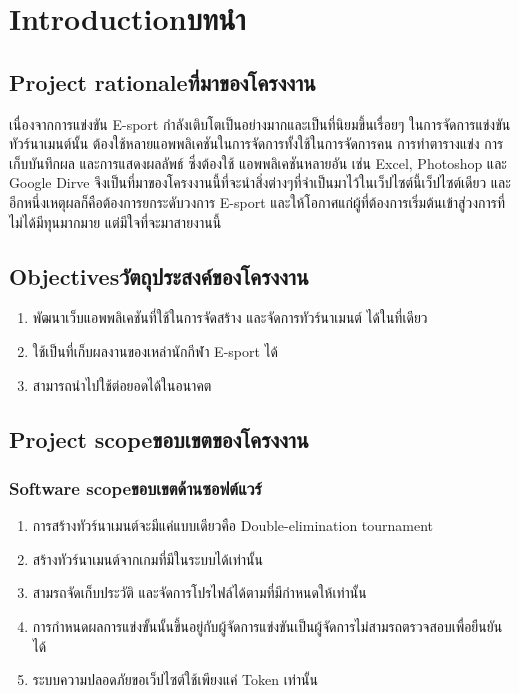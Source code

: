 \chapter{\ifenglish Introduction\else บทนำ\fi}

\section{\ifenglish Project rationale\else ที่มาของโครงงาน\fi}
เนื่องจากการแข่งขัน E-sport กำลังเติบโตเป็นอย่างมากและเป็นที่นิยมขึ้นเรื่อยๆ ในการจัดการแข่งขันทัวร์นาเมนต์นั้น
ต้องใช้หลายแอพพลิเคชันในการจัดการทั้งใช้ในการจัดการคน การทำตารางแข่ง การเก็บบันทึกผล และการแสดงผลลัพธ์ ซึ่งต้องใช้
แอพพลิเคชันหลายอัน เช่น Excel, Photoshop และ Google Dirve   จึงเป็นที่มาของโครงงานนี้ที่จะนำสิ่งต่างๆที่จำเป็นมาไว้ในเว็ปไซต์นี้เว็ปไซต์เดียว
และ อีกหนึ่งเหตุผลก็คือต้องการยกระดับวงการ E-sport และให้โอกาศแก่ผู้ที่ต้องการเริ่มต้นเข้าสู่วงการที่ไม่ได้มีทุนมากมาย แต่มีใจที่จะมาสายงานนี้  


\section{\ifenglish Objectives\else วัตถุประสงค์ของโครงงาน\fi}
\begin{enumerate}
    \item พัฒนาเว็บแอพพลิเคชันที่ใช้ในการจัดสร้าง และจัดการทัวร์นาเมนต์ ได้ในที่เดียว
    \item ใช้เป็นที่เก็บผลงานของเหล่านักกีฬา E-sport ได้
    \item สามารถนำไปใช้ต่อยอดได้ในอนาคต
\end{enumerate}

\section{\ifenglish Project scope\else ขอบเขตของโครงงาน\fi}

\subsection{\ifenglish Software scope\else ขอบเขตด้านซอฟต์แวร์\fi}
\begin{enumerate}
    \item การสร้างทัวร์นาเมนต์จะมีแค่แบบเดียวคือ Double-elimination tournament \cite{tournament}
    \item สร้างทัวร์นาเมนต์จากเกมที่มีในระบบได้เท่านั้น 
    \item สามรถจัดเก็บประวัติ และจัดการโปรไฟล์ได้ตามที่มีกำหนดให้เท่านั้น
    \item การกำหนดผลการแข่งขั้นนั้นขึ้นอยู่กับผู้จัดการแข่งขันเป็นผู้จัดการไม่สามรถตรวจสอบเพื่อยืนยันได้
    \item ระบบความปลอดภัยขอเว็ปไซต์ใช้เพียงแค่ Token เท่านั้น
\end{enumerate}

